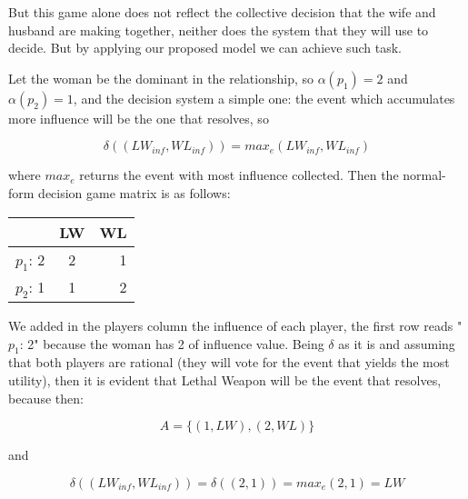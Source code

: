 But this game alone does not reflect the collective decision that the wife and husband are making together, neither does the system that they will use to decide. But by applying our proposed model we can achieve such task.

Let the woman be the dominant in the relationship, so $\alpha(p_1) = 2$ and $\alpha(p_2) = 1$, and the decision system a simple one: the event which accumulates more influence will be the one that resolves, so 

$$\delta((LW_{inf}, WL_{inf})) = max_e(LW_{inf}, WL_{inf})$$

where $max_e$ returns the event with most influence collected. Then the normal-form decision game matrix is as follows:

\begin{center}
  \begin{tabular}{| l | c | r |}
    \hline
     & LW & WL \\ \hline
    $p_1$: 2 & 2 & 1 \\ \hline
    $p_2$: 1 & 1 & 2 \\ \hline
  \end{tabular}
\end{center}

We added in the players column the influence of each player, the first row reads "$p_1$: 2" because the woman has 2 of influence value. Being $\delta$ as it is and assuming that both players are rational (they will vote for the event that yields the most utility), then it is evident that Lethal Weapon will be the event that resolves, because then:

$$ A = \{(1, LW), (2, WL)\} $$

and

$$\delta((LW_{inf}, WL_{inf})) = \delta((2, 1)) = max_e(2, 1) = LW$$